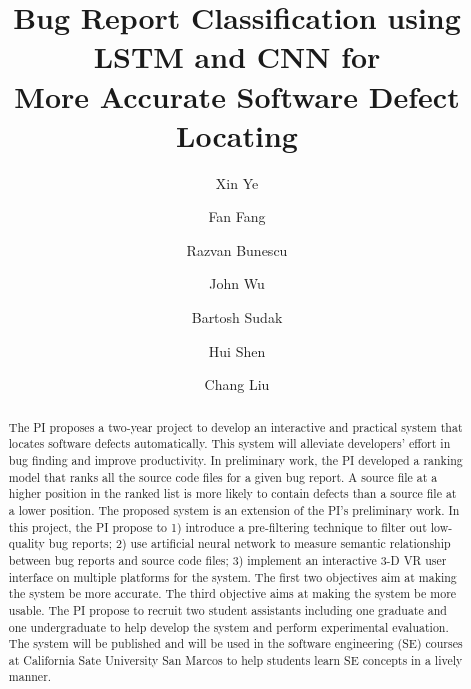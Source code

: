 \documentclass[sigconf, review, anonymous]{acmart}
\begin{document}
\title{Bug Report Classification using LSTM and CNN for \\More Accurate Software Defect Locating}

\author{Xin Ye}

\author{Fan Fang}

\author{Razvan Bunescu}

\author{John Wu}

\author{Bartosh Sudak}

\author{Hui Shen}

\author{Chang Liu}

\begin{abstract}
The PI proposes a two-year project to develop an interactive and practical system that locates software defects automatically. This system will alleviate developers' effort in bug finding and improve productivity. In preliminary work, the PI developed a ranking model that ranks all the source code files for a given bug report. A source file at a higher position in the ranked list is more likely to contain defects than a source file at a lower position. The proposed system is an extension of the PI's preliminary work. In this project, the PI propose to 1) introduce a pre-filtering technique to filter out low-quality bug reports; 2) use artificial neural network to measure semantic relationship between bug reports and source code files; 3) implement an interactive 3-D VR user interface on multiple platforms for the system. The first two objectives aim at making the system be more accurate. The third objective aims at making the system be more usable. The PI propose to recruit two student assistants including one graduate and one undergraduate to help develop the system and perform experimental evaluation. The system will be published and will be used in the software engineering (SE) courses at California Sate University San Marcos to help students learn SE concepts in a lively manner.
\end{abstract}
\end{document}
